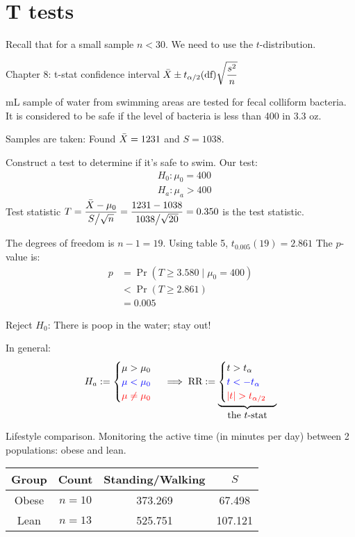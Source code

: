 \section{T tests} %
Recall that for a small sample $n < 30$. We need to use the $t$-distribution.

\nl Chapter 8: t-stat confidence interval $\displaystyle \bar{X} \pm t_{\alpha/2}(\text{df})\sqrt{\frac{s^2}{n}}$

 mL sample of water from swimming areas are tested for fecal colliform bacteria. It is considered to be safe if the level of bacteria is less than 400 in 3.3 oz.

 Samples are taken: Found $\bar{X} = 1231$ and $S = 1038$.

\nl Construct a test to determine if it's safe to swim. Our test:
\begin{align*}
    &H_0 : \mu_0 = 400\\
    &H_a : \mu_a > 400
\end{align*}
Test statistic $\displaystyle T = \frac{\bar{X} - \mu_0}{S \big/ \sqrt{n}} = \frac{1231 - 1038}{1038\big/\sqrt{20}} = 0.350$ is the test statistic.

\nl The degrees of freedom is $n - 1 = 19$. Using table 5, $t_{0.005}(19)=2.861$ The $p$-value is: 
\begin{align*}
    p &= \Pr(T \geq 3.580 \mid \mu_0 = 400)\\
    &< \Pr(T \geq 2.861)\\
    &= 0.005
\end{align*}

\nl Reject $H_0$: There is poop in the water; stay out!

\remark* In general:
$$\displaystyle H_a := \begin{cases} \mu > \mu_0 \\ \color{blue} \mu < \mu_0 \\ \color{red} \mu \neq \mu_0 \end{cases} \implies \text{RR} := \underbrace{\begin{cases}t > t_{\alpha} \\ \color{blue} t < -t_{\alpha}\\ \color{red} \abs{t} > t_{\alpha/2} \end{cases}}_{\textstyle \text{the } t \text{-stat}}$$

\example Lifestyle comparison. Monitoring the active time (in minutes per day) between 2 populations: obese and lean.
\begin{center}
    \begin{tabular}{ |c|c|c|c| } 
        \hline
        \textbf{Group} & \textbf{Count} & \textbf{Standing/Walking} & $S$\\
        \hline
        Obese & $n=10$ & 373.269 & 67.498\\ 
        \hline
        Lean & $n=13$ &  525.751 & 107.121\\ 
        \hline
      \end{tabular}
    \end{center}


